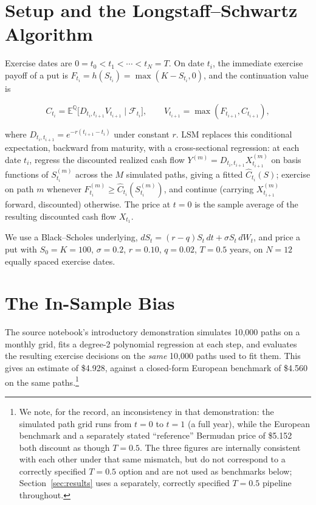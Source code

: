 \documentclass[11pt]{article}
\begin{document}
\section{Setup and the Longstaff--Schwartz Algorithm}
\label{sec:setup}

Exercise dates are $0 = t_0 < t_1 < \cdots < t_N = T$. On date $t_i$, the immediate exercise payoff of a put is $F_{t_i} = h(S_{t_i}) = \max(K - S_{t_i}, 0)$, and the continuation value is

\begin{equation}
C_{t_i} = \mathbb{E}^{\mathbb{Q}}\bigl[D_{t_i,t_{i+1}} V_{t_{i+1}} \mid \mathcal{F}_{t_i}\bigr], \qquad V_{t_{i+1}} = \max(F_{t_{i+1}}, C_{t_{i+1}}),
\end{equation}

where $D_{t_i,t_{i+1}} = e^{-r(t_{i+1}-t_i)}$ under constant $r$. LSM replaces this conditional expectation, backward from maturity, with a cross-sectional regression: at each date $t_i$, regress the discounted realized cash flow $Y^{(m)} = D_{t_i,t_{i+1}} X_{t_{i+1}}^{(m)}$ on basis functions of $S_{t_i}^{(m)}$ across the $M$ simulated paths, giving a fitted $\widehat C_{t_i}(S)$; exercise on path $m$ whenever $F_{t_i}^{(m)} \ge \widehat C_{t_i}(S_{t_i}^{(m)})$, and continue (carrying $X_{t_{i+1}}^{(m)}$ forward, discounted) otherwise. The price at $t=0$ is the sample average of the resulting discounted cash flow $X_{t_1}$.

We use a Black--Scholes underlying, $dS_t = (r-q)S_t\,dt + \sigma S_t\,dW_t$, and price a put with $S_0=K=100$, $\sigma=0.2$, $r=0.10$, $q=0.02$, $T=0.5$ years, on $N=12$ equally spaced exercise dates.

\section{The In-Sample Bias}
\label{sec:bias}

The source notebook's introductory demonstration simulates 10{,}000 paths on a monthly grid, fits a degree-2 polynomial regression at each step, and evaluates the resulting exercise decisions on the \emph{same} 10{,}000 paths used to fit them. This gives an estimate of \$4.928, against a closed-form European benchmark of \$4.560 on the same paths.\footnote{We note, for the record, an inconsistency in that demonstration: the simulated path grid runs from $t=0$ to $t=1$ (a full year), while the European benchmark and a separately stated ``reference'' Bermudan price of \$5.152 both discount as though $T=0.5$. The three figures are internally consistent with each other under that same mismatch, but do not correspond to a correctly specified $T=0.5$ option and are not used as benchmarks below; Section~\ref{sec:results} uses a separately, correctly specified $T=0.5$ pipeline throughout.}
\end{document}
